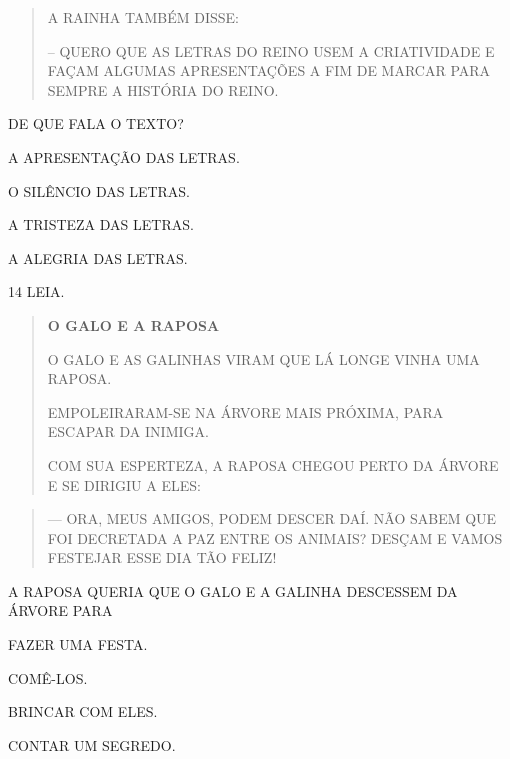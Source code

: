 \begin{quote}
A RAINHA TAMBÉM DISSE:

-- QUERO QUE AS LETRAS DO REINO USEM A CRIATIVIDADE E FAÇAM ALGUMAS
APRESENTAÇÕES A FIM DE MARCAR PARA SEMPRE A HISTÓRIA DO REINO.

\end{quote}

DE QUE FALA O TEXTO?

\begin{escolha}
\item A APRESENTAÇÃO DAS LETRAS.

\item O SILÊNCIO DAS LETRAS.

\item A TRISTEZA DAS LETRAS. 

\item A ALEGRIA DAS LETRAS.
\end{escolha}

\num{14} LEIA.

\begin{quote}
\textbf{O GALO E A RAPOSA}

O GALO E AS GALINHAS VIRAM QUE LÁ LONGE VINHA UMA RAPOSA.

EMPOLEIRARAM-SE NA ÁRVORE MAIS PRÓXIMA, PARA ESCAPAR DA INIMIGA.

COM SUA ESPERTEZA, A RAPOSA CHEGOU PERTO DA ÁRVORE E
SE DIRIGIU A ELES:
\end{quote}

\pagebreak
\begin{quote}
--- ORA, MEUS AMIGOS, PODEM DESCER DAÍ. NÃO SABEM QUE
FOI DECRETADA A PAZ ENTRE OS ANIMAIS? DESÇAM E VAMOS FESTEJAR ESSE
DIA TÃO FELIZ!

\end{quote}

A RAPOSA QUERIA QUE O GALO E A GALINHA DESCESSEM DA ÁRVORE PARA

\begin{escolha}
\item FAZER UMA FESTA.

\item COMÊ-LOS.

\item BRINCAR COM ELES.

\item CONTAR UM SEGREDO.
\end{escolha}

